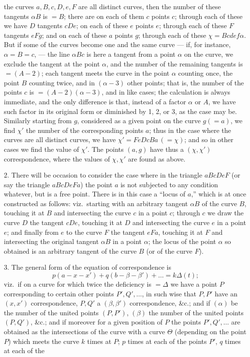 \documentclass[11pt,a4paper]{article}
\theoremstyle{plain}
\theoremstyle{definition}
\begin{document}
the curves $a, B, c, D, e, F$ are all distinct curves, then the number of these
tangents $\alpha B$ is $=B$; there are on each of them $c$ points $c$; through each of these
we have $D$ tangents $cDe$; on each of these $e$ points $e$; through each of these
$F$ tangents $eFg$; and on each of these $a$ points $g$; through each of these $\chi=Bcdef\alpha$.  But if some
of the curves become one and the same curve --- if, for instance, $\alpha=B=c$, --- the line
$\alpha Bc$ is here a tangent from a point $\alpha$ on the curve, we exclude the tangent at the
point $\alpha$, and the number of the remaining tangents is $=(A-2)$; each tangent meets
the curve in the point $\alpha$ counting once, the point $B$ counting twice, and in $(\alpha-3)$
other points; that is, the number of the points $c$ is $=(A-2)(\alpha-3)$, and in like
cases; the calculation is always immediate, and the only difference is that, instead of
a factor $\alpha$ or $A$, we have such factor in its original form or diminished by 1, 2,
or 3, as the case may be.  Similarly starting from $g$, considered as a given point on
the curve $g(=a)$, we find $\chi'$ the number of the corresponding points $a$; thus in the
case where the curves are all distinct curves, we have $\chi'=FeDcBa\, (=\chi)$; and so in
other cases we find the value of $\chi'$.  The points $(a, g)$ have thus a $(\chi, \chi')$ correspondence, where the values of $\chi, \chi'$ are found as above.

2. There will be occasion to consider the case where in the triangle $aBcDeF$ (or
say the triangle $aBcDeFa$) the point $a$ is not subjected to any condition whatever,
but is a free point.  There is in this case a ``locus of $a$,'' which is at once constructed as follows: viz.\ starting with an arbitrary tangent $\alpha B$ of the curve $B$,
touching it at $B$ and intersecting the curve $c$ in a point $c$; through $c$ we draw
the curve $D$ the tangent $cDe$, touching it at $D$ and intersecting the curve $e$ in a
point $e$; and finally from $e$ to the curve $F$ the tangent $eFa$, touching it at $F$ and
intersecting the original tangent $\alpha B$ in a point $\alpha$; the locus of the point $\alpha$ so
obtained is an arbitrary tangent of the curve $B$ (or of the curve $F$).

3. The general form of the equation of correspondence is
\[
p(a-x-x')+q(b-\beta-\beta')+ \ldots = k\Delta(t);
\]
viz.\ if on a curve for which twice the deficiency is $=\Delta$ we have a point $P$ corresponding to certain other points $P', Q', \ldots$, in such wise that $P, P'$ have an $(x, x')$
correspondence, $P, Q'$ a $(\beta, \beta')$ correspondence, \&c.; and if $(\alpha)$ be the number of the
united points $(P, P')$, $(\beta)$ the number of the united points $(P, Q')$, \&c.; and if moreover for a given position of $P$ the points $P', Q', \ldots$ are obtained as the
intersections of the curve with a curve $\Theta$ (depending on the point $P$) which meets
the curve $k$ times at $P$; $p$ times at each of the points $P'$, $q$ times at each of the
\end{document}
